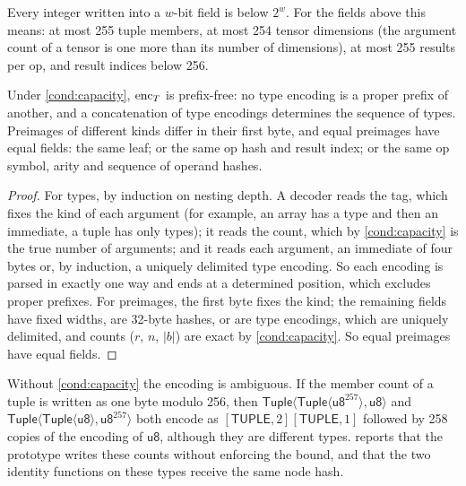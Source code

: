 \begin{assumption}\label{cond:capacity}
Every integer written into a $w$-bit field is below $2^w$. For the fields above this means: at
most 255 tuple members, at most 254 tensor dimensions (the argument count of a tensor is one
more than its number of dimensions), at most 255 results per op, and result indices below 256.
\end{assumption}

\begin{lemma}\label{lem:prefixfree}
Under \cref{cond:capacity}, $\mathrm{enc}_T$ is prefix-free: no type encoding is a proper prefix of
another, and a concatenation of type encodings determines the sequence of types. Preimages of
different kinds differ in their first byte, and equal preimages have equal fields: the same
leaf; or the same op hash and result index; or the same op symbol, arity and sequence of operand
hashes.
\end{lemma}
\begin{proof}
For types, by induction on nesting depth. A decoder reads the tag, which fixes the kind of each
argument (for example, an array has a type and then an immediate, a tuple has only types); it
reads the count, which by \cref{cond:capacity} is the true number of arguments; and it reads
each argument, an immediate of four bytes or, by induction, a uniquely delimited type
encoding. So each encoding is parsed in exactly one way and ends at a determined position,
which excludes proper prefixes. For preimages, the first byte fixes the kind; the remaining
fields have fixed widths, are 32-byte hashes, or are type encodings, which are uniquely
delimited, and counts ($r$, $n$, $|b|$) are exact by \cref{cond:capacity}. So equal preimages
have equal fields.
\end{proof}

\begin{remark}\label{rem:capacity}
Without \cref{cond:capacity} the encoding is ambiguous. If the member count of a tuple is
written as one byte modulo 256, then $\mathsf{Tuple}\langle\mathsf{Tuple}\langle
\mathsf{u8}^{257}\rangle,\mathsf{u8}\rangle$ and
$\mathsf{Tuple}\langle\mathsf{Tuple}\langle\mathsf{u8}\rangle,\mathsf{u8}^{257}\rangle$ both
encode as $[\mathsf{TUPLE},2][\mathsf{TUPLE},1]$ followed by 258 copies of the encoding of
$\mathsf{u8}$, although they are different types.  reports that the prototype
writes these counts without enforcing the bound, and that the two identity functions on these
types receive the same node hash.
\end{remark}

